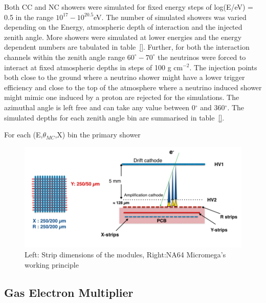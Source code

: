 Both CC and NC showers were simulated for fixed energy steps of log(E/eV) = 0.5 in the range $10^{17}-10^{20.5}$eV. The number of simulated showers was varied depending on the Energy, atmospheric depth of interaction and the injected zenith angle. More showers were simulated at lower energies and the energy dependent numbers are tabulated in table~\ref{}. Further, for both the interaction channels within the zenith angle range $60^{\circ}-70^{\circ}$ the neutrinos were forced to interact at fixed atmospheric depths in steps of 100 g cm$^{-2}$. The injection points both close to the ground where a neutrino shower might have a lower trigger efficiency and close to the top of the atmosphere where a neutrino induced shower might mimic one induced by a proton are rejected for the simulations. The azimuthal angle is left free and can take any value between 0$^{\circ}$ and 360$^{\circ}$. The simulated depths for each zenith angle bin are summarised in table~\ref{}. 

For each (E,$\theta_{MC}$,X) bin the primary shower 













\begin{figure}[t!]
\centering
\includegraphics[width=\textwidth]{thesis_figures/NA64_MM.png}
\caption{Left: Strip dimensions of the modules, Right:NA64 Micromega's working principle~\cite{Banerjee:2017mdu}}
\label{fig:Micromegas_na64}
\end{figure}

\subsection{Gas Electron Multiplier}
\label{sec:GEM}

